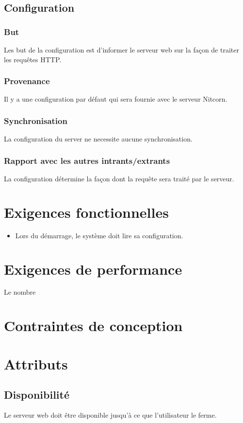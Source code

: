 \documentclass{scrreprt}
\begin{document}
\subsection{Configuration}
\subsubsection{But} Les but de la configuration est d'informer le serveur web sur la façon de traiter les requêtes HTTP.
\subsubsection{Provenance} Il y a une configuration par défaut qui sera fournie avec le serveur Nitcorn. 
\subsubsection{Synchronisation} La configuration du server ne necessite aucune synchronisation.
\subsubsection{Rapport avec les autres intrants/extrants} La configuration détermine la façon dont la requête sera traité par le serveur.
\section{Exigences fonctionnelles}
\begin{itemize}
    \item Lors du démarrage, le système doit lire sa configuration.
\end{itemize}
\section{Exigences de performance} Le nombre 
\section{Contraintes de conception}
\section{Attributs}
\subsection{Disponibilité}
Le serveur web doit être disponible jusqu'à ce que l'utilisateur le ferme.
\end{document}

